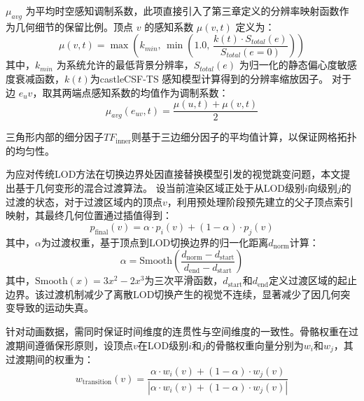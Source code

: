 $\mu_{avg}$ 为平均时空感知调制系数，此项直接引入了第三章定义的分辨率映射函数作为几何细节的保留比例。顶点 $v$ 的感知系数 $\mu(v, t)$ 定义为：
\begin{equation}
\mu(v, t) = \max \left( k_{min}, \, \min \left( 1.0, \, \frac{k(t) \cdot S_{total}(e)}{S_{total}(e=0)} \right) \right)
\label{eq:perceptual_factor}
\end{equation}
其中，$k_{min}$ 为系统允许的最低背景分辨率，\(S_{total}(e)\) 为归一化的静态偏心度敏感度衰减函数，$k(t)$为castleCSF-TS 感知模型计算得到的分辨率缩放因子。
对于边 $e_uv$，取其两端点感知系数的均值作为调制系数：
\begin{equation}
\mu_{avg}(e_{uv}, t) = \frac{\mu(u, t) + \mu(v, t)}{2}
\end{equation}

三角形内部的细分因子$TF_{\text{inner}}$则基于三边细分因子的平均值计算，以保证网格拓扑的均匀性。



为应对传统LOD方法在切换边界处因直接替换模型引发的视觉跳变问题，本文提出基于几何变形的混合过渡算法。
设当前渲染区域正处于从LOD级别$i$向级别$j$的过渡的状态，对于过渡区域内的顶点$v$，利用预处理阶段预先建立的父子顶点索引映射，其最终几何位置通过插值得到：
\begin{equation}
p_{\text{final}}(v) = \alpha \cdot p_i(v) + (1-\alpha) \cdot p_j(v)
\label{eq:geometry_interpolation}
\end{equation}
其中，$\alpha$为过渡权重，基于顶点到LOD切换边界的归一化距离$d_{\text{norm}}$计算：
\begin{equation}
\alpha = \text{Smooth}\left(\frac{d_{\text{norm}} - d_{\text{start}}}{d_{\text{end}} - d_{\text{start}}}\right)
\label{eq:transition_weight}
\end{equation}
其中，$\text{Smooth}(x) = 3x^2 - 2x^3$为三次平滑函数，$d_{\text{start}}$和$d_{\text{end}}$定义过渡区域的起止边界。该过渡机制减少了离散LOD切换产生的视觉不连续，显著减少了因几何突变导致的运动失真。

针对动画数据，需同时保证时间维度的连贯性与空间维度的一致性。骨骼权重在过渡期间遵循保形原则，设顶点$v$在LOD级别$i$和$j$的骨骼权重向量分别为$w_i$和$w_j$，其过渡期间的权重为：
\begin{equation}
w_{\text{transition}}(v) = \frac{\alpha \cdot w_i(v) + (1-\alpha) \cdot w_j(v)}{|\alpha \cdot w_i(v) + (1-\alpha) \cdot w_j(v)|}
\label{eq:weight_interpolation}
\end{equation}

